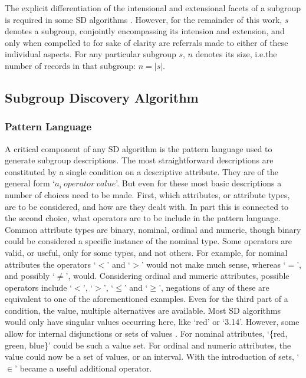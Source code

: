 \documentclass[smallextended]{svjour3}
\newcommand{\subgroup}[1]{\mbox{`$#1$'}}
\newcommand{\op}[1]{`$#1$'}
\newcommand{\ds}[1]{\mathcal{D}_{#1}}
\newcommand{\sd}{SD}
\begin{document}
The explicit differentiation of the intensional and extensional facets of a subgroup is required in some \sd{} algorithms \cite{leeuwen:2012}.
However, for the remainder of this work, $s$ denotes a subgroup, conjointly encompassing its intension and extension, and only when compelled to for sake of clarity are referrals made to either of these individual aspects.
For any particular subgroup $s$, $n$ denotes its size, i.e.\@ the number of records in that subgroup: $n=|s|$.



\subsection{Subgroup Discovery Algorithm}
\label{section:subgroup-discovery-algorithm}


\subsubsection{Pattern Language}
\label{section:pattern-language}

A critical component of any \sd{} algorithm is the pattern language used to generate subgroup descriptions.
The most straightforward descriptions are constituted by a single condition on a descriptive attribute.
They are of the general form \subgroup{a_i\ operator\ value}.
But even for these most basic descriptions a number of choices need to be made.
First, which attributes, or attribute types, are to be considered, and how are they dealt with.
In part this is connected to the second choice, what operators are to be include in the pattern language.
Common attribute types are binary, nominal, ordinal and numeric, though binary could be considered a specific instance of the nominal type.
Some operators are valid, or useful, only for some types, and not others.
For example, for nominal attributes the operators \op{<} and \op{>} would not make much sense, whereas \op{=}, and possibly \op{\neq}, would.
Considering ordinal and numeric attributes, possible operators include \op{<}, \op{>}, \op{\leq} and \op{\geq}, negations of any of these are equivalent to one of the aforementioned examples.
Even for the third part of a condition, the value, multiple alternatives are available.
Most \sd{} algorithms would only have singular values occurring here, like `red' or `3.14'.
However, some allow for internal disjunctions \cite{kloesgen:1999,atzmueller:2006} or sets of values \cite{mampaey:2012,mampaey:2015}.
For nominal attributes, `\{red, green, blue\}' could be such a value set.
For ordinal and numeric attributes, the value could now be a set of values, or an interval.
With the introduction of sets, \op{\in} became a useful additional operator.
\end{document}
